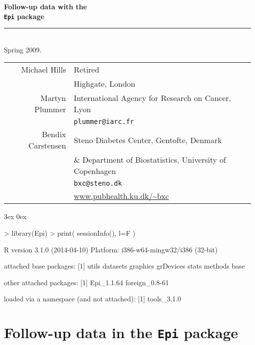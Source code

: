 \documentclass[a4paper,twoside,12pt]{article}
\begin{document}
\raggedleft
\pagestyle{empty}
\vspace*{0.1\textheight}
\Huge
{\bf Follow-up data with the\\ \texttt{Epi} package}
\noindent\rule[-1ex]{\textwidth}{5pt}\\[2.5ex]
\Large
Spring 2009.
\vfill
\normalsize
\begin{tabular}{rl}
 Michael Hills & Retired \\
               & Highgate, London \\[1em]
Martyn Plummer & International Agency for Research on Cancer, Lyon\\
               & \texttt{plummer@iarc.fr} \\[1em]
Bendix Carstensen & Steno Diabetes Center, Gentofte, Denmark\\
                  & \small \& Department of Biostatistics,
                    University of Copenhagen\\
                  & \normalsize \texttt{bxc@steno.dk} \\
                  & \url{www.pubhealth.ku.dk/~bxc}
\end{tabular}
\normalsize
\newpage
\raggedright
\parindent 3ex
\parskip 0ex
\tableofcontents
\cleardoublepage
\setcounter{page}{1}
\pagestyle{fancy}
\renewcommand{\sectionmark}[1]{\markboth{\thesection #1}{\thesection \ #1}}
\fancyhead[ER]{\sl \rightmark}
\fancyhead[EL,OR]{\bf \thepage}
\fancyfoot{}
\renewcommand{\headrulewidth}{0.1pt}

\begin{Schunk}
\begin{Sinput}
> library(Epi)
> print( sessionInfo(), l=F )
\end{Sinput}
\begin{Soutput}
R version 3.1.0 (2014-04-10)
Platform: i386-w64-mingw32/i386 (32-bit)

attached base packages:
[1] utils     datasets  graphics  grDevices stats     methods   base     

other attached packages:
[1] Epi_1.1.64     foreign_0.8-61

loaded via a namespace (and not attached):
[1] tools_3.1.0
\end{Soutput}
\end{Schunk}

\section{Follow-up data in the \texttt{Epi} package}
\end{document}
